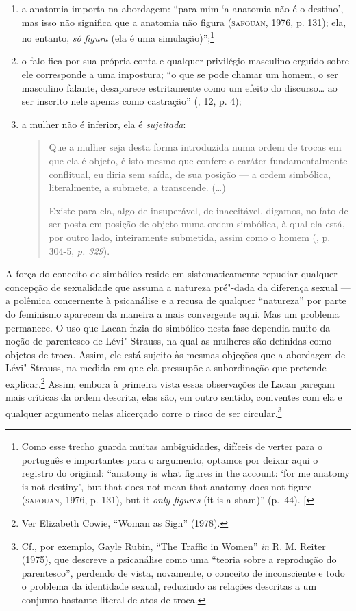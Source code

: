 \begin{enumerate}
\def\labelenumi{\arabic{enumi})}
\item
  a anatomia importa na abordagem: ``para mim `a anatomia não é o
  destino', mas isso não significa que a anatomia não figura (\textsc{safouan},
  1976, p. 131); ela, no entanto, \emph{só figura} (ela é uma
  simulação)'';\footnote{Como esse trecho guarda muitas ambiguidades,
    difíceis de verter para o português e importantes para o argumento,
    optamos por deixar aqui o registro do original: ``anatomy is what
    figures in the account: `for me anatomy is not destiny', but that
    does not mean that anatomy does not figure (\textsc{safouan}, 1976, p. 131),
    but it \emph{only figures} (it is a sham)'' (p.~44). {[}\versal{N.~T.}{]}}
\item
  o falo fica por sua própria conta e qualquer privilégio masculino
  erguido sobre ele corresponde a uma impostura; ``o que se pode chamar
  um homem, o ser masculino falante, desaparece estritamente como um
  efeito do discurso\ldots{} ao ser inscrito nele apenas como castração''
  (, 12, p. 4); %
\item
  a mulher não é inferior, ela é \emph{sujeitada}:
\begin{quote}
Que a mulher seja desta forma introduzida numa ordem de trocas em que
ela é objeto, é isto mesmo que confere o caráter fundamentalmente
conflitual, eu diria sem saída, de sua posição --- a ordem simbólica,
literalmente, a submete, a transcende. (\ldots{})

Existe para ela, algo de insuperável, de inaceitável, digamos, no fato
de ser posta em posição de objeto numa ordem simbólica, à qual ela está,
por outro lado, inteiramente submetida, assim como o homem (, p.
304-5, \emph{p. 329}).
\end{quote}

\end{enumerate}

A força do conceito de simbólico reside em sistematicamente repudiar
qualquer concepção de sexualidade que assuma a natureza pré"-dada da
diferença sexual --- a polêmica concernente à psicanálise e a recusa de
qualquer ``natureza'' por parte do feminismo aparecem da maneira a mais
convergente aqui. Mas um problema permanece. O uso que Lacan fazia do
simbólico nesta fase dependia muito da noção de parentesco de
Lévi"-Strauss, na qual as mulheres são definidas como objetos de troca.
Assim, ele está sujeito às mesmas objeções que a abordagem de
Lévi"-Strauss, na medida em que ela pressupõe a subordinação que pretende
explicar.\footnote{Ver Elizabeth Cowie, ``Woman as Sign'' (1978).}
Assim, embora à primeira vista essas observações de Lacan pareçam mais
críticas da ordem descrita, elas são, em outro sentido, coniventes com
ela e qualquer argumento nelas alicerçado corre o risco de ser
circular.\footnote{Cf., por exemplo, Gayle Rubin, ``The Traffic in Women''
  \emph{in} R. M. Reiter (1975), que descreve a psicanálise como uma
  ``teoria sobre a reprodução do parentesco'', perdendo de vista,
  novamente, o conceito de inconsciente e todo o problema da identidade
  sexual, reduzindo as relações descritas a um conjunto bastante literal
  de atos de troca.}

